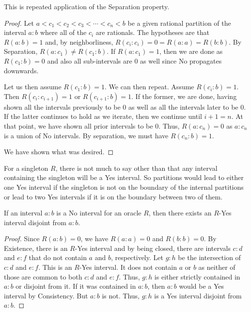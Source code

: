 \documentclass[12pt]{article}
\begin{document}
This is repeated application of the Separation property. 

\begin{proof}
Let $a < c_1 < c_2 < c_3 < \cdots < c_n < b$ be a given rational partition of the interval $a:b$ where all of the $c_i$ are rationals. The hypotheses are that $R(a:b) = 1$ and, by neighborliness, $R(c_i:c_i) = 0 = R(a:a) = R(b:b)$. By Separation, $R(a:c_1) \neq R(c_1:b)$. If $R(a:c_1)=1$, then we are done as $R(c_1:b)=0$ and also all sub-intervals are 0 as well since No propagates downwards. 

Let us then assume $R(c_1:b)=1$. We can then repeat. Assume $R(c_i:b)=1$. Then $R(c_i:c_{i+1})=1$ or $R(c_{i+1}:b)=1$. If the former, we are done, having shown all the intervals previously to be 0 as well as all the intervals later to be 0.  If the latter continues to hold as we iterate, then we continue until $i+1 = n$. At that point, we have shown all prior intervals to be 0. Thus, $R(a:c_n)=0$ as $a:c_{n}$ is a union of No intervals. By separation, we must have $R(c_n:b) = 1$. 

We have shown what was desired. 
\end{proof}

For a singleton $R$, there is not much to say other than that any interval containing the singleton will be a Yes interval. So partitions would lead to either one Yes interval if the singleton is not on the boundary of the internal partitions or lead to two Yes intervals if it is on the boundary between two of them. 

\begin{proposition}\label{pr:no-is-disjoint}
    If an interval $a:b$ is a No interval for an oracle $R$, then there exists an $R$-Yes interval disjoint from $a:b$.
\end{proposition}

\begin{proof}
    Since $R(a:b) = 0$, we have $R(a:a) = 0$ and $R(b:b) = 0$. By Existence, there is an $R$-Yes interval and by being closed, there are intervals $c:d$ and $e:f$ that do not contain $a$ and $b$, respectively. Let $g:h$ be the intersection of $c:d$ and $e:f$. This is an $R$-Yes interval. It does not contain $a$ or $b$ as neither of those are common to both $c:d$ and $e:f$. Thus, $g:h$ is either strictly contained in $a:b$ or disjoint from it. If it was contained in $a:b$, then $a:b$ would be a Yes interval by Consistency. But $a:b$ is not. Thus, $g:h$ is a Yes interval disjoint from $a:b$.
\end{proof}
\end{document}
